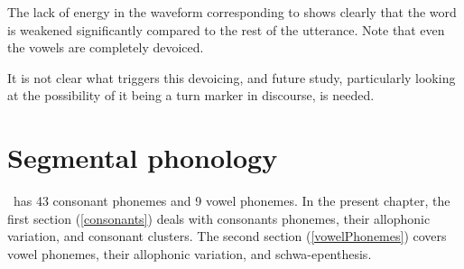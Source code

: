 The lack of energy in the waveform corresponding to  shows clearly that the word is weakened significantly compared to the rest of the utterance. Note that even the vowels are completely devoiced.

It is not clear what triggers this devoicing, and future study, particularly looking at the possibility of it being a turn marker in discourse, is needed.

%
%



\chapter{Segmental phonology}\label{csANDvs}
\PS\ has 43 consonant phonemes and 9 vowel phonemes. In the present chapter, the first section (\SEC\ref{consonants}) deals with consonants phonemes, their allophonic variation, and consonant clusters. 
The second section (\SEC\ref{vowelPhonemes}) covers vowel phonemes, their allophonic variation, and schwa-epenthesis. 



